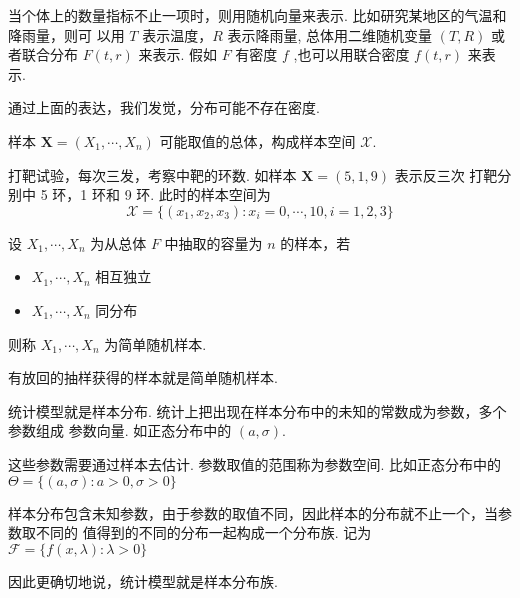 \documentclass[openany]{book}
\begin{document}
当个体上的数量指标不止一项时，则用随机向量来表示. 比如研究某地区的气温和降雨量，则可
以用 $T$ 表示温度，$R$ 表示降雨量, 总体用二维随机变量 $(T,R)$ 或者联合分布
$F(t,r)$ 来表示. 假如 $F$ 有密度 $f$ ,也可以用联合密度 $f(t,r)$ 来表示.

\begin{remark}
  通过上面的表达，我们发觉，分布可能不存在密度.
\end{remark}

\begin{definition}
  样本 $\mathbf{X} = (X_1,\cdots,X_n)$ 可能取值的总体，构成样本空间
  $\mathscr{X}$.
\end{definition}

\begin{example}
  打靶试验，每次三发，考察中靶的环数. 如样本 $\mathbf{X} = (5,1,9)$ 表示反三次
  打靶分别中 5 环，1 环和 9 环. 此时的样本空间为
  \begin{equation}
   \mathscr{X} = \{(x_1,x_2,x_3):x_i = 0,\cdots,10,i = 1,2,3\}
  \end{equation}
\end{example}

\begin{definition}
  设 $X_1,\cdots,X_n$ 为从总体 $F$ 中抽取的容量为 $n$ 的样本，若
  \begin{itemize}
    \item $X_1,\cdots,X_n$ 相互独立
    \item $X_1,\cdots,X_n$ 同分布
  \end{itemize}
  则称 $X_1,\cdots,X_n$ 为简单随机样本.
\end{definition}
有放回的抽样获得的样本就是简单随机样本.

\begin{remark}
  统计模型就是样本分布. 统计上把出现在样本分布中的未知的常数成为参数，多个参数组成
  参数向量. 如正态分布中的 $(a,\sigma)$.
\end{remark}
这些参数需要通过样本去估计. 参数取值的范围称为参数空间. 比如正态分布中的 $\Theta
= \{(a,\sigma):a>0,\sigma>0\}$

\begin{remark}
  样本分布包含未知参数，由于参数的取值不同，因此样本的分布就不止一个，当参数取不同的
  值得到的不同的分布一起构成一个分布族. 记为 $\mathscr{F} =
  \{f(x,\lambda):\lambda >0\} $
\end{remark}
因此更确切地说，统计模型就是样本分布族.
\end{document}
